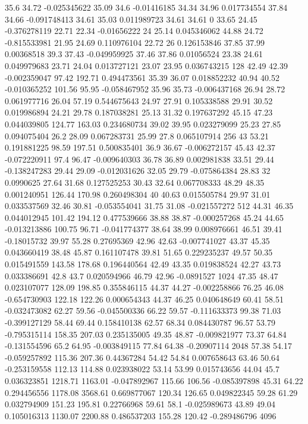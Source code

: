 35.6	34.72	-0.025345622	35.09	34.6	-0.01416185	34.34	34.96	0.017734554	37.84	34.66	-0.091748413	34.61	35.03	0.011989723	34.61	34.61	0	33.65	24.45	-0.376278119	22.71	22.34	-0.01656222	24	25.14	0.045346062	44.88	24.72	-0.815533981	21.95	24.69	0.110976104	22.72	26	0.126153846	37.85	37.99	0.00368518	39.3	37.43	-0.049959925	37.46	37.86	0.01056524	23.38	24.61	0.049979683	23.71	24.04	0.013727121	23.07	23.95	0.036743215	128
42.49	42.39	-0.002359047	97.42	192.71	0.494473561	35.39	36.07	0.018852232	40.94	40.52	-0.010365252	101.56	95.95	-0.058467952	35.96	35.73	-0.006437168	26.94	28.72	0.061977716	26.04	57.19	0.544675643	24.97	27.91	0.105338588	29.91	30.52	0.019986894	24.21	29.78	0.187038281	25.13	31.32	0.197637292	45.15	47.23	0.044039805	124.77	163.03	0.234680734	39.02	39.95	0.023279099	25.23	27.85	0.094075404	26.2	28.09	0.067283731	25.99	27.8	0.065107914	256
43	53.21	0.191881225	98.59	197.51	0.500835401	36.9	36.67	-0.006272157	45.43	42.37	-0.072220911	97.4	96.47	-0.009640303	36.78	36.89	0.002981838	33.51	29.44	-0.138247283	29.44	29.09	-0.012031626	32.05	29.79	-0.075864384	28.83	32	0.0990625	27.64	31.68	0.127525253	30.43	32.64	0.067708333	48.29	48.35	0.001240951	126.44	170.98	0.260498304	40	40.63	0.015505784	29.97	31.01	0.033537569	32.46	30.81	-0.053554041	31.75	31.08	-0.021557272	512
44.31	46.35	0.044012945	101.42	194.12	0.477539666	38.88	38.87	-0.000257268	45.24	44.65	-0.013213886	100.75	96.71	-0.041774377	38.64	38.99	0.008976661	46.51	39.41	-0.18015732	39.97	55.28	0.27695369	42.96	42.63	-0.007741027	43.37	45.35	0.043660419	38.48	45.87	0.161107478	39.81	51.65	0.229235237	49.57	50.35	0.015491559	143.58	178.68	0.196440564	42.49	43.35	0.019838524	42.27	43.73	0.033386691	42.8	43.7	0.020594966	46.79	42.96	-0.0891527	1024
47.35	48.47	0.023107077	128.09	198.85	0.355846115	44.37	44.27	-0.002258866	76.25	46.08	-0.654730903	122.18	122.26	0.000654343	44.37	46.25	0.040648649	60.41	58.51	-0.032473082	62.27	59.56	-0.045500336	66.22	59.57	-0.111633373	99.38	71.03	-0.399127129	58.44	69.44	0.158410138	62.57	68.34	0.084430787	96.57	53.79	-0.795315114	158.35	207.03	0.235135005	49.35	48.87	-0.009821977	73.37	64.84	-0.131554596	65.2	64.95	-0.003849115	77.84	64.38	-0.20907114	2048
57.38	54.17	-0.059257892	115.36	207.36	0.44367284	54.42	54.84	0.007658643	63.46	50.64	-0.253159558	112.13	114.88	0.023938022	53.14	53.99	0.015743656	44.04	45.7	0.036323851	1218.71	1163.01	-0.047892967	115.66	106.56	-0.085397898	45.31	64.22	0.294456556	1178.08	3568.61	0.669877067	120.34	126.65	0.049822345	59.28	61.29	0.032794909	151.23	195.81	0.22766968	59.61	58.1	-0.025989673	43.89	49.04	0.105016313	1130.07	2200.88	0.486537203	155.28	120.42	-0.289486796	4096
